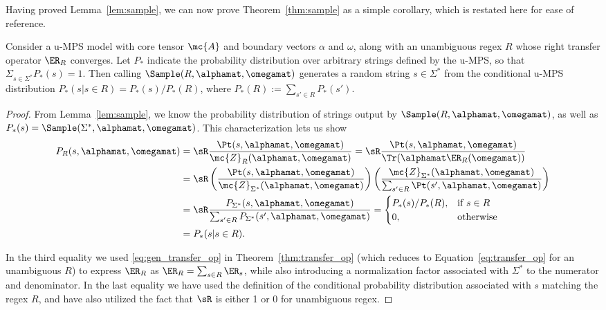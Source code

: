 Having proved Lemma~\ref{lem:sample}, we can now prove Theorem~\ref{thm:sample} 
as a simple corollary, which is restated here for ease of reference.

\begin{theorem*}
Consider a u-MPS model with core tensor $\mc{A}$ and boundary vectors $\alpha$ and $\omega$, along with an unambiguous regex $R$ whose right transfer operator $\ER_R$ converges. Let $P_*$ indicate the probability distribution over arbitrary strings defined by the u-MPS, so that $\Sigma_{s\in\Sigma^*} P_*(s) = 1$. Then calling $\Sample(R, \alphamat, \omegamat)$ generates a random string $s \in \Sigma^*$ from the conditional u-MPS distribution $P_*(s | s \in R) = P_*(s) / P_*(R)$, where $P_*(R) := \sum_{s' \in R} P_*(s')$.
\end{theorem*}

\begin{proof}

From Lemma~\ref{lem:sample}, we know the probability distribution of strings output by $\Sample(R, \alphamat, \omegamat)$, as well as $P_*(s) = \Sample(\Sigma^*, \alphamat, \omegamat)$. This characterization lets us show
%
\begin{align*}
    P_R(s, \alphamat, \omegamat) &= \sR \frac{\Pt(s, \alphamat, \omegamat)}{\mc{Z}_R(\alphamat, \omegamat)} = \sR \frac{\Pt(s, \alphamat, \omegamat)}{\Tr(\alphamat \ER_R(\omegamat))} \\
    &= \sR \left( \frac{\Pt(s, \alphamat, \omegamat)}{\mc{Z}_{\Sigma^*}(\alphamat, \omegamat)} \right) \left( \frac{\mc{Z}_{\Sigma^*}(\alphamat, \omegamat)}{\sum_{s' \in R} \Pt(s', \alphamat, \omegamat)} \right) \\
    &= \sR \frac{P_{\Sigma^*}(s, \alphamat, \omegamat)}{\sum_{s' \in R} P_{\Sigma^*}(s', \alphamat, \omegamat)} = 
    \begin{cases}
    P_*(s) / P_*(R), &\text{if } s \in R\\
    0, &\text{otherwise}
    \end{cases} \\
    &= P_*(s | s \in R).
\end{align*}

In the third equality we used \eqref{eq:gen_transfer_op} in Theorem~\ref{thm:transfer_op} (which reduces to Equation~\eqref{eq:transfer_op} 
for an unambiguous $R$) to express $\ER_R$ as $\ER_R = \sum_{s \in R} \ER_s$, while also introducing a normalization factor associated with $\Sigma^*$ to the numerator and denominator. In the last equality we have used the definition of the conditional probability distribution associated with $s$ matching the regex $R$, and have also utilized the fact that $\sR$ is either 1 or 0 for unambiguous regex.

\end{proof}

